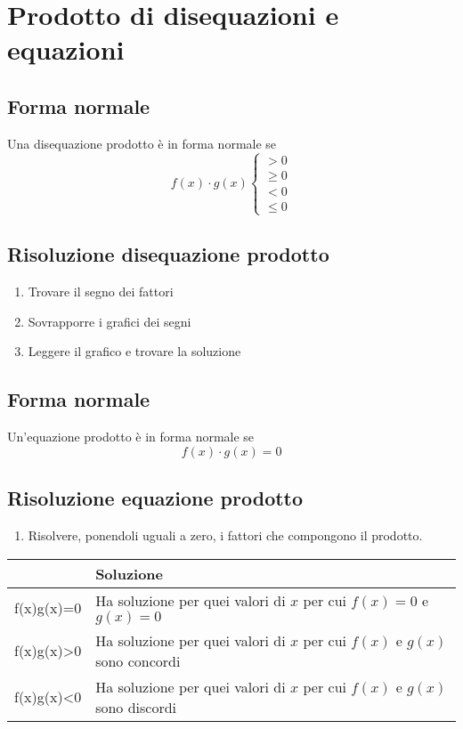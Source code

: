 \chapter{Prodotto di disequazioni e equazioni}
\section{Forma normale}
Una disequazione prodotto è in forma normale se
\begin{equation*}
f(x)\cdot g(x)\begin{cases}
>0\\
\geq 0\\
<0\\
\leq 0
\end{cases}
\end{equation*}
\section{Risoluzione disequazione prodotto}
\begin{enumerate}
	\item Trovare il segno dei fattori
	\item Sovrapporre i grafici dei segni
	\item Leggere il grafico e trovare la soluzione
\end{enumerate}
\section{Forma normale}
Un'equazione prodotto è in forma normale se
\begin{equation*}
f(x)\cdot g(x)=0
\end{equation*}
\section{Risoluzione equazione prodotto}
\begin{enumerate}
	\item Risolvere, ponendoli uguali a zero, i fattori che compongono il prodotto.
\end{enumerate}
\begin{center}
	\begin{tabular}{Cp{0.4\textwidth}}
		\toprule
		& Soluzione \\ 
		\midrule
		f(x)\cdot g(x)=0	& Ha soluzione per quei valori di $x$ per cui $f(x)=0$ e $g(x)= 0$  \\ 
		f(x)\cdot g(x)>0	& Ha soluzione per quei valori di $x$ per cui $f(x)$ e $g(x)$ sono concordi\\ 
	f(x)\cdot g(x)<0& Ha soluzione per quei valori di $x$ per cui $f(x)$ e $g(x)$ sono discordi\\ 
		\bottomrule
	\end{tabular}
\end{center}
